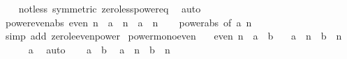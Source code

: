 \begin{isabellebody}
%
\isadelimproof
\ \ %
\endisadelimproof
%
\isatagproof
{}\isamarkupfalse%
\ not{\isacharunderscore}{\kern0pt}less\ {\isacharbrackleft}{\kern0pt}symmetric{\isacharbrackright}{\kern0pt}\ zero{\isacharunderscore}{\kern0pt}less{\isacharunderscore}{\kern0pt}power{\isacharunderscore}{\kern0pt}eq\ \isamarkupfalse%
\ auto%
\endisatagproof
{\isafoldproof}%
%
\isadelimproof
\isanewline
%
\endisadelimproof
\isanewline
{}\isamarkupfalse%
\ power{\isacharunderscore}{\kern0pt}even{\isacharunderscore}{\kern0pt}abs{\isacharcolon}{\kern0pt}\ {\isachardoublequoteopen}even\ n\ {\isasymLongrightarrow}\ {\isasymbar}a{\isasymbar}\ {\isacharcircum}{\kern0pt}\ n\ {\isacharequal}{\kern0pt}\ a\ {\isacharcircum}{\kern0pt}\ n{\isachardoublequoteclose}\isanewline
%
\isadelimproof
\ \ %
\endisadelimproof
%
\isatagproof
{}\isamarkupfalse%
\ power{\isacharunderscore}{\kern0pt}abs\ {\isacharbrackleft}{\kern0pt}of\ a\ n{\isacharbrackright}{\kern0pt}\ \isamarkupfalse%
\ {\isacharparenleft}{\kern0pt}simp\ add{\isacharcolon}{\kern0pt}\ zero{\isacharunderscore}{\kern0pt}le{\isacharunderscore}{\kern0pt}even{\isacharunderscore}{\kern0pt}power{\isacharparenright}{\kern0pt}%
\endisatagproof
{\isafoldproof}%
%
\isadelimproof
\isanewline
%
\endisadelimproof
\isanewline
{}\isamarkupfalse%
\ power{\isacharunderscore}{\kern0pt}mono{\isacharunderscore}{\kern0pt}even{\isacharcolon}{\kern0pt}\isanewline
\ \ \ {\isachardoublequoteopen}even\ n{\isachardoublequoteclose}\ \ {\isachardoublequoteopen}{\isasymbar}a{\isasymbar}\ {\isasymle}\ {\isasymbar}b{\isasymbar}{\isachardoublequoteclose}\isanewline
\ \ \ {\isachardoublequoteopen}a\ {\isacharcircum}{\kern0pt}\ n\ {\isasymle}\ b\ {\isacharcircum}{\kern0pt}\ n{\isachardoublequoteclose}\isanewline
%
\isadelimproof
%
\endisadelimproof
%
\isatagproof
{}\isamarkupfalse%
\ {\isacharminus}{\kern0pt}\isanewline
\ \ \isamarkupfalse%
\ {\isachardoublequoteopen}{}\ {\isasymle}\ {\isasymbar}a{\isasymbar}{\isachardoublequoteclose}\ \isamarkupfalse%
\ auto\isanewline
\ \ \isamarkupfalse%
\ {\isacartoucheopen}{\isasymbar}a{\isasymbar}\ {\isasymle}\ {\isasymbar}b{\isasymbar}{\isacartoucheclose}\ \isamarkupfalse%
\ {\isachardoublequoteopen}{\isasymbar}a{\isasymbar}\ {\isacharcircum}{\kern0pt}\ n\ {\isasymle}\ {\isasymbar}b{\isasymbar}\ {\isacharcircum}{\kern0pt}\ n{\isachardoublequoteclose}\isanewline
\ \ \ \ \isamarkupfalse%

\end{isabellebody}
